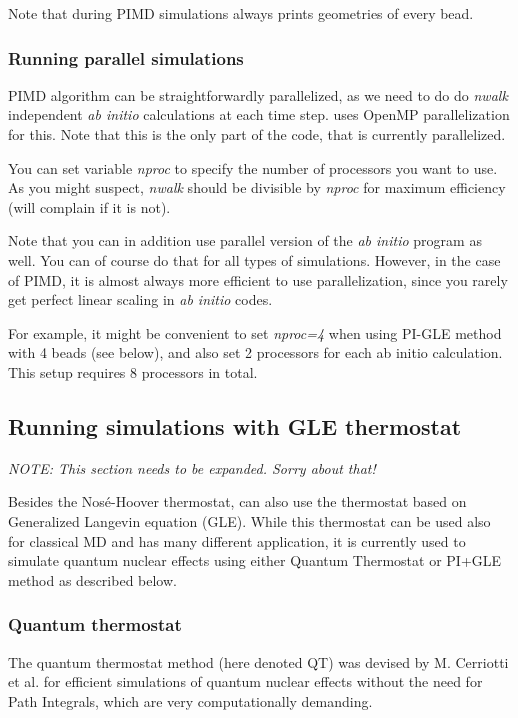 Note that during PIMD simulations \abin always prints geometries of every bead.

\subsubsection{Running parallel simulations}

PIMD algorithm can be straightforwardly parallelized, as we need to do do \textit{nwalk} independent \textit{ab initio} calculations at each time step.
\abin uses OpenMP parallelization for this. Note that this is the only part of the code, that is currently parallelized.

You can set variable \textit{nproc} to specify the number of processors you want to use. As you might suspect, \textit{nwalk} should be divisible by \textit{nproc} for maximum efficiency (\abin will complain if it is not).

Note that you can in addition use parallel version of the \textit{ab initio} program as well. You can of course do that for all types of simulations. However, in the case of PIMD, it is almost always more efficient to use \abin parallelization, since you rarely get perfect linear scaling in \textit{ab initio} codes.

For example, it might be convenient to set \textit{nproc=4} when using PI-GLE method with 4 beads (see below), and also set 2 processors for each ab initio calculation. This setup requires 8 processors in total.

\subsection{Running simulations with GLE thermostat}
\textit{NOTE: This section needs to be expanded. Sorry about that! 
}

Besides the Nosé-Hoover thermostat, \abin can also use the thermostat based on Generalized Langevin equation (GLE). While this thermostat can be used also for classical MD and has many different application, it is currently used to simulate quantum nuclear effects using either Quantum Thermostat or PI+GLE method as described below.

\subsubsection{Quantum thermostat}

The quantum thermostat method (here denoted QT) was devised by M. Cerriotti et al. %
for efficient simulations of quantum nuclear effects without the need for Path Integrals, which are very computationally demanding. 

